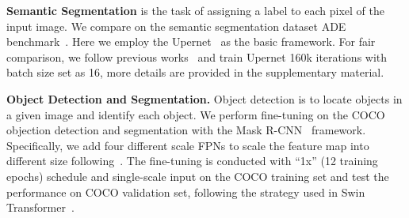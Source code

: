 \documentclass[letterpaper]{article} \usepackage{aaai23}  \usepackage{times}  \usepackage{helvet}  \usepackage{courier}  \usepackage[hyphens]{url}  \usepackage{graphicx} \urlstyle{rm} \def\UrlFont{\rm}  \usepackage{natbib}  \usepackage{caption} \frenchspacing  \setlength{\pdfpagewidth}{8.5in}  \setlength{\pdfpageheight}{11in}  \usepackage{algorithm}
\begin{document}
\noindent \textbf{Semantic Segmentation} 
is the task of assigning a label to each pixel of the input image.
We compare on the semantic segmentation dataset ADE benchmark~\cite{zhou2017scene}.
Here we employ the Upernet~\cite{xiao2018unified} as the basic framework. For fair comparison, we follow previous works~\cite{bao2021beit} and train Upernet 160k iterations with batch size set as 16, more details are provided in the supplementary material.

\noindent \textbf{Object Detection and Segmentation.}
Object detection is to 
locate objects in a given image and identify each object.
We perform fine-tuning on the COCO objection detection and segmentation with the Mask R-CNN~\cite{he2017mask} framework. Specifically, we add four different scale FPNs to scale the feature map into different size following~\cite{bao2021beit}. The fine-tuning is conducted with ``1x'' (12 training epochs) schedule and single-scale input on the COCO training set and test the performance on COCO validation set, following the strategy used in Swin Transformer~\cite{liu2021swin}.






\begin{table}[t]
\centering
\small
{}
\caption{Tokenizer comparison with BEiT. Here we report tokenizer training dataset and \#parameters. PeCo is a lite version of PeCo that reduces the channel number of tokenizer by half.}

\label{tbl:cls:tokenizer}
\end{table}
\end{document}
